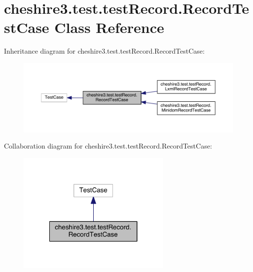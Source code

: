 \hypertarget{classcheshire3_1_1test_1_1test_record_1_1_record_test_case}{\section{cheshire3.\-test.\-test\-Record.\-Record\-Test\-Case Class Reference}
\label{classcheshire3_1_1test_1_1test_record_1_1_record_test_case}
}


Inheritance diagram for cheshire3.\-test.\-test\-Record.\-Record\-Test\-Case\-:
\nopagebreak
\begin{figure}[H]
\begin{center}
\leavevmode
\includegraphics[width=350pt]{classcheshire3_1_1test_1_1test_record_1_1_record_test_case__inherit__graph}
\end{center}
\end{figure}


Collaboration diagram for cheshire3.\-test.\-test\-Record.\-Record\-Test\-Case\-:
\nopagebreak
\begin{figure}[H]
\begin{center}
\leavevmode
\includegraphics[width=212pt]{classcheshire3_1_1test_1_1test_record_1_1_record_test_case__coll__graph}
\end{center}
\end{figure}
